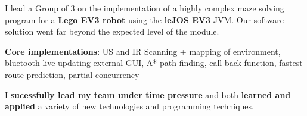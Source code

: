 \documentclass[]{jonas-cv}
\begin{document}
\begin{minipage}[t]{0.63\textwidth}
\begin{tightemize}
   \item I lead a Group of 3 on the implementation of a highly complex maze solving program for a \href{https://education.lego.com/en-gb/product/mindstorms-ev3}{\textbf{Lego EV3 robot}} using the \href{http://www.lejos.org/}{\textbf{leJOS EV3}} JVM. 
   Our software solution went far beyond the expected level of the module.
   \item \textbf{Core implementations}: US and IR Scanning + mapping of environment, bluetooth live-updating external GUI, A* path finding, 
   call-back function, fastest route prediction, partial concurrency
   \item[\faicon{angle-double-right}] I \textbf{sucessfully lead my team under time pressure} and both \textbf{learned and applied} a variety of new technologies and programming techniques.
\end{tightemize}




\end{minipage}
\end{document}
